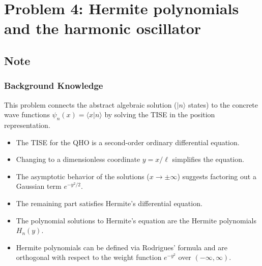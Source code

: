 \documentclass[10pt]{article}
\begin{document}
\section*{Problem 4: Hermite polynomials and the harmonic oscillator}

\subsection*{Note}

\subsubsection*{Background Knowledge}
This problem connects the abstract algebraic solution (\(|n\rangle\) states) to the concrete wave functions \(\psi_n(x) = \langle x | n \rangle\) by solving the TISE in the position representation.
\begin{itemize}
    \item The TISE for the QHO is a second-order ordinary differential equation.
    \item Changing to a dimensionless coordinate \(y=x/\ell\) simplifies the equation.
    \item The asymptotic behavior of the solutions (\(x\to\pm\infty\)) suggests factoring out a Gaussian term \(e^{-y^2/2}\).
    \item The remaining part satisfies Hermite's differential equation.
    \item The polynomial solutions to Hermite's equation are the Hermite polynomials \(H_n(y)\).
    \item Hermite polynomials can be defined via Rodrigues' formula and are orthogonal with respect to the weight function \(e^{-y^2}\) over \((-\infty, \infty)\).
\end{itemize}
\end{document}
